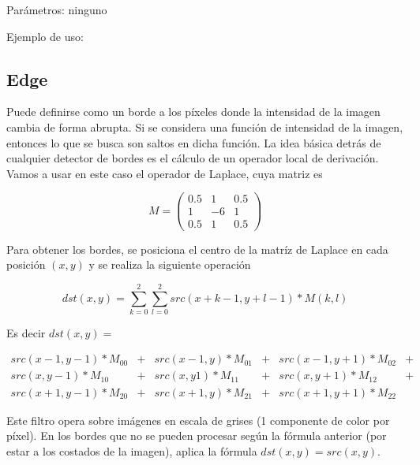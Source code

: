 \noindent Parámetros: ninguno

\noindent Ejemplo de uso: 





\subsection{Edge}

Puede definirse como un borde a los p\'ixeles donde la intensidad de la imagen cambia de forma abrupta. 
Si se considera una funci\'on de intensidad de la imagen, entonces lo que se busca son saltos en dicha funci\'on.
La idea b\'asica detr\'as de cualquier detector de bordes es el c\'alculo de un operador local de derivaci\'on. \\
 

Vamos a usar en este caso el operador de Laplace, cuya matriz es

$$ M = \left(
\begin{matrix}
    0.5 & 1 & 0.5 \\
    1 & -6 & 1 \\
    0.5 & 1 & 0.5
\end{matrix}
\right)$$


Para obtener los bordes, se posiciona el centro de la matr\'iz de 
Laplace en cada posici\'on $(x, y)$ y se realiza la siguiente operaci\'on

$$dst(x, y) = \sum_{k = 0}^2 \sum_{l = 0}^2 src(x + k - 1, y + l - 1) * M(k, l)$$

Es decir $dst(x, y) = $
\begin{center}
    $\begin{matrix}
        src(x - 1, y - 1) * M_{00} & + & src(x - 1, y) * M_{01} & + & src(x - 1, y + 1) * M_{02} & +\\
        src(x, y - 1) * M_{10} & + & src(x, y1) * M_{11} & + & src(x, y + 1) * M_{12} & +\\ 
        src(x + 1, y - 1) * M_{20} & + & src(x + 1, y) * M_{21} & + & src(x + 1, y + 1) * M_{22} &
    \end{matrix}$
\end{center}

Este filtro opera sobre imágenes en escala de grises (1 componente de color por píxel).
En los bordes que no se pueden procesar según la fórmula anterior (por estar a los costados de la
imagen), aplica la fórmula $dst(x, y) = src(x,y)$.

